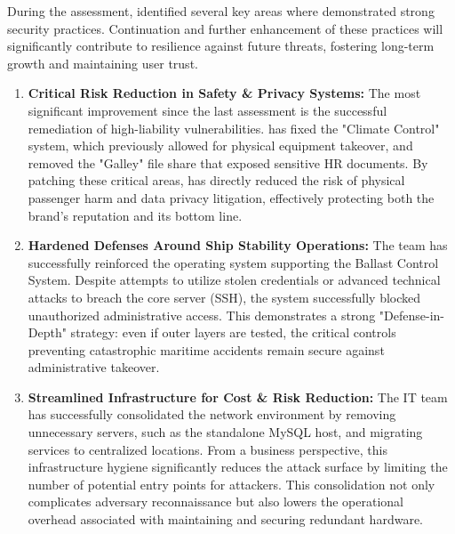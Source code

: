 During the assessment, \team identified several key areas where \client demonstrated strong security practices. Continuation and further enhancement of these practices will significantly contribute to \clientP resilience against future threats, fostering long-term growth and maintaining user trust.

\begin{enumerate}
\item \textbf{Critical Risk Reduction in Safety \& Privacy Systems:} The most significant improvement since the last assessment is the successful remediation of high-liability vulnerabilities. \client has fixed the "Climate Control" system, which previously allowed for physical equipment takeover, and removed the "Galley" file share that exposed sensitive HR documents. By patching these critical areas, \client has directly reduced the risk of physical passenger harm and data privacy litigation, effectively protecting both the brand's reputation and its bottom line.\item \textbf{Hardened Defenses Around Ship Stability Operations:} The team has successfully reinforced the operating system supporting the Ballast Control System. Despite \teamP attempts to utilize stolen credentials or advanced technical attacks to breach the core server (SSH), the system successfully blocked unauthorized administrative access. This demonstrates a strong "Defense-in-Depth" strategy: even if outer layers are tested, the critical controls preventing catastrophic maritime accidents remain secure against administrative takeover.\item \textbf{Streamlined Infrastructure for Cost \& Risk Reduction:} The IT team has successfully consolidated the network environment by removing unnecessary servers, such as the standalone MySQL host, and migrating services to centralized locations. From a business perspective, this infrastructure hygiene significantly reduces the attack surface by limiting the number of potential entry points for attackers. This consolidation not only complicates adversary reconnaissance but also lowers the operational overhead associated with maintaining and securing redundant hardware.
\end{enumerate}
